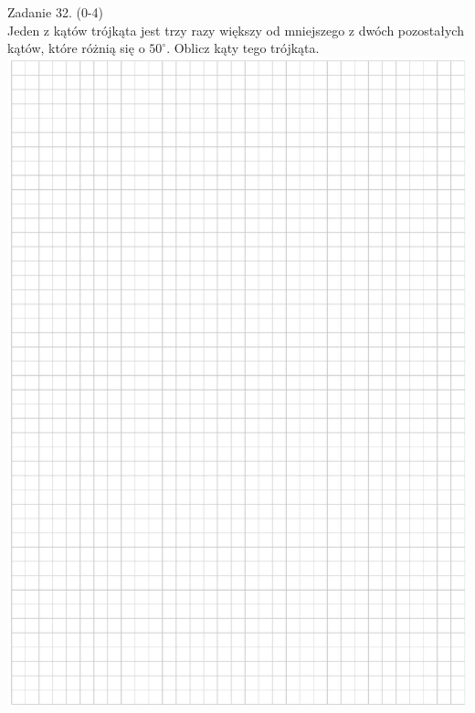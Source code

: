 \documentclass[10pt]{article}
\begin{document}
Zadanie 32. (0-4)\\
Jeden z kątów trójkąta jest trzy razy większy od mniejszego z dwóch pozostałych kątów, które różnią się o \(50^{\circ}\). Oblicz kąty tego trójkąta.\\
\includegraphics[max width=\textwidth, center]{2024_11_21_1c92fcc0db78c9202015g-18}\\
\end{document}
